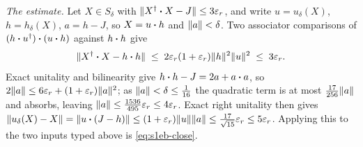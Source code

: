 \emph{The estimate.} Let $X\in S_\delta$ with $\lVert X^{\dagger}\mathbin{\bm{\cdot}} X-J\rVert\le3\varepsilon_r$, and write
$u=u_\delta(X)$, $h=h_\delta(X)$, $a=h-J$, so $X=u\mathbin{\bm{\cdot}} h$ and $\lVert a\rVert<\delta$. Two
associator comparisons of $(h\mathbin{\bm{\cdot}} u^{\dagger})\mathbin{\bm{\cdot}}(u\mathbin{\bm{\cdot}} h)$ against $h\mathbin{\bm{\cdot}} h$ give
\begin{equation}\label{eq:s1eb-square}
  \lVert X^{\dagger}\mathbin{\bm{\cdot}} X-h\mathbin{\bm{\cdot}} h\rVert\;\le\;2\varepsilon_r(1+\varepsilon_r)\lVert h\rVert^{2}\lVert u\rVert^{2}\;\le\;3\varepsilon_r .
\end{equation}
Exact unitality and bilinearity give $h\mathbin{\bm{\cdot}} h-J=2a+a\mathbin{\bm{\cdot}} a$, so
$2\lVert a\rVert\le6\varepsilon_r+(1+\varepsilon_r)\lVert a\rVert^{2}$; as $\lVert a\rVert<\delta\le\tfrac1{16}$ the quadratic
term is at most $\tfrac{17}{256}\lVert a\rVert$ and absorbs, leaving
$\lVert a\rVert\le\tfrac{1536}{495}\varepsilon_r\le4\varepsilon_r$. Exact right unitality then gives
$\lVert u_\delta(X)-X\rVert=\lVert u\mathbin{\bm{\cdot}}(J-h)\rVert\le(1+\varepsilon_r)\lVert u\rVert\lVert a\rVert
\le\tfrac{17}{\sqrt{15}}\varepsilon_r\le5\varepsilon_r$. Applying this to the two inputs typed above is
\eqref{eq:s1eb-close}.


